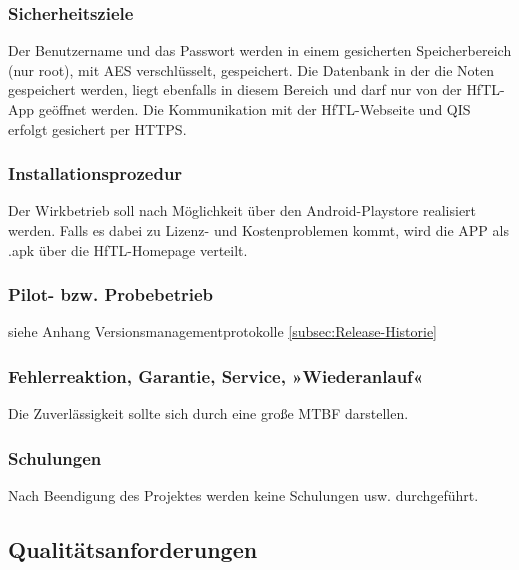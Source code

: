 \subsubsection{Sicherheitsziele}
Der Benutzername und das Passwort werden in einem gesicherten Speicherbereich (nur root), mit \acs{AES} verschlüsselt, gespeichert.
Die Datenbank in der die Noten gespeichert werden, liegt ebenfalls in diesem Bereich und darf nur von der \acs{HfTL}-App geöffnet werden.
Die Kommunikation mit der \acs{HfTL}-Webseite und \acs{QIS} erfolgt gesichert per \acs{HTTPS}.



\subsubsection{Installationsprozedur}

Der Wirkbetrieb soll nach Möglichkeit über den Android-Playstore realisiert werden. Falls es dabei zu Lizenz- und Kostenproblemen kommt, wird die APP als \ac{.apk} über die HfTL-Homepage verteilt.



\subsubsection{Pilot- bzw. Probebetrieb}

siehe Anhang Versionsmanagementprotokolle \ref{subsec:Release-Historie}





\subsubsection{Fehlerreaktion, Garantie, Service, »Wiederanlauf«}
Die Zuverlässigkeit sollte sich durch eine große \ac{MTBF} darstellen.



\subsubsection{Schulungen}
Nach Beendigung des Projektes werden keine Schulungen usw. durchgeführt.


\subsection{\textbf{Qualitätsanforderungen}}

